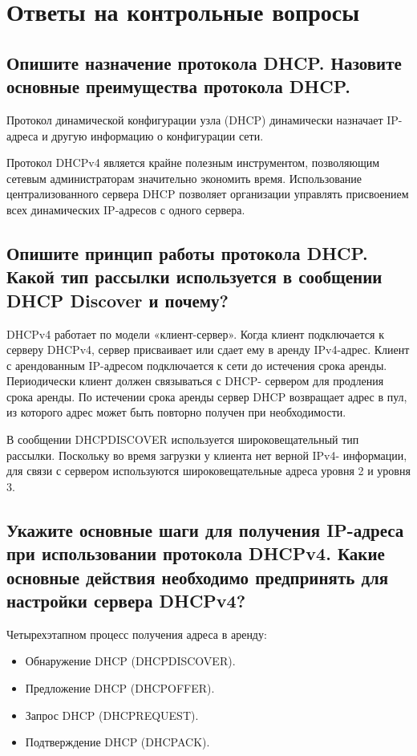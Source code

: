 \section{Ответы на контрольные вопросы}
\subsection{Опишите назначение протокола DHCP. Назовите основные
преимущества протокола DHCP.}
Протокол динамической конфигурации узла (DHCP) динамически
назначает IP-адреса и другую информацию о конфигурации сети.

Протокол DHCPv4 является крайне полезным инструментом,
позволяющим сетевым администраторам значительно экономить время.
Использование централизованного сервера DHCP позволяет
организации управлять присвоением всех динамических IP-адресов с одного
сервера.

\subsection{Опишите принцип работы протокола DHCP. Какой тип
рассылки используется в сообщении DHCP Discover и почему?}
DHCPv4 работает по модели «клиент-сервер». Когда клиент
подключается к серверу DHCPv4, сервер присваивает или сдает ему в аренду
IPv4-адрес. Клиент с арендованным IP-адресом подключается к сети до
истечения срока аренды. Периодически клиент должен связываться с DHCP-
сервером для продления срока аренды. По истечении срока аренды сервер
DHCP возвращает адрес в пул, из которого адрес может быть повторно
получен при необходимости.

В сообщении DHCPDISCOVER используется широковещательный тип
рассылки. Поскольку во время загрузки у клиента нет верной IPv4-
информации, для связи с сервером используются широковещательные адреса
уровня 2 и уровня 3.

\subsection{Укажите основные шаги для получения IP-адреса при
использовании протокола DHCPv4. Какие основные действия
необходимо предпринять для настройки сервера DHCPv4?}
Четырехэтапном процесс получения адреса в аренду:
\begin{itemize}
    \item Обнаружение DHCP (DHCPDISCOVER).
    \item Предложение DHCP (DHCPOFFER).
    \item Запрос DHCP (DHCPREQUEST).
    \item Подтверждение DHCP (DHCPACK).
\end{itemize}


